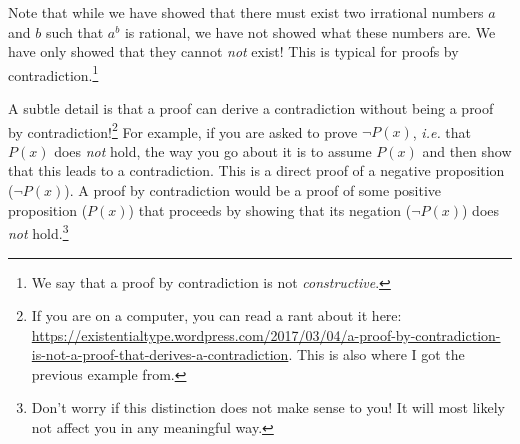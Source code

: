\documentclass{tufte-handout}
\newcounter{example}
\newenvironment{example}
{\refstepcounter{example}\begin{quote}
\textbf{Example \arabic{example}}}
{

$\square$\end{quote}}
\begin{document}
\noindent
Note that while we have showed that there must exist two
irrational numbers $a$ and $b$ such that $a^b$ is rational, we
have not showed what these numbers are. We have only showed that
they cannot \emph{not} exist! This is typical for proofs by
contradiction.\footnote{We say that a proof by contradiction is
  not \emph{constructive}.}




A subtle detail is that a proof can derive a contradiction without
being a proof
by contradiction!\footnote{If you are on a computer, you can read a rant about it here: \\
  \url{https://existentialtype.wordpress.com/2017/03/04/a-proof-by-contradiction-is-not-a-proof-that-derives-a-contradiction}.
  This is also where I got the previous example from.}
%
For example, if you are asked to prove $\lnot P(x)$, \emph{i.e.}
that $P(x)$ does \emph{not} hold, the way you go about it is to
assume $P(x)$ and then show that this leads to a contradiction.
%
This is a direct proof of a negative proposition ($\lnot P(x)$). A
proof by contradiction would be a proof of some positive proposition
($P(x)$) that proceeds by showing that its negation ($\lnot P(x)$)
does \emph{not} hold.\footnote{Don't worry if this distinction
  does not make sense to you! It will most likely not affect you
  in any meaningful way.}
\end{document}

